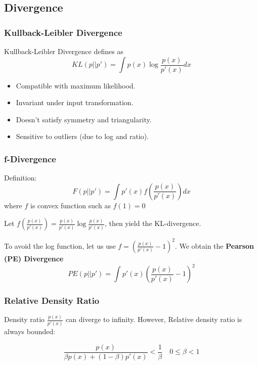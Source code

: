 \documentclass[slidestop,compress,mathserif]{beamer}
\begin{document}
	\subsection{Divergence}
	\begin{frame}
		\frametitle{Kullback-Leibler Divergence}
		Kullback-Leibler Divergence defines as
		\begin{equation}
			KL(p||p') = \int p(x) \log\frac{p(x)}{p'(x)}dx
		\end{equation}
		\begin{itemize}
			\item[\smiley]  Compatible with maximum likelihood.
			\item[\smiley]  Invariant under input transformation.
			\item[\frownie]  Doesn’t satisfy symmetry and triangularity.
			\item[\frownie]  Sensitive to outliers (due to log and ratio).
		\end{itemize}
	\end{frame}
	
	\begin{frame}
		\frametitle{f-Divergence}
		Definition:
		\begin{equation}
			F(p||p') = \int p'(x)f\left(\frac{p(x)}{p'(x)}\right)dx
		\end{equation}
		where $f$ is convex function such as $f(1)=0$
		
		Let $f\left(\frac{p(x)}{p'(x)}\right) = \frac{p(x)}{p'(x)}\log \frac{p(x)}{p'(x)}$, then yield the KL-divergence.
		
		To avoid the log function, let us use $f = \left(\frac{p(x)}{p'(x)}-1\right)^2$. We obtain the \textbf{Pearson (PE) Divergence}
		\begin{equation}
			PE(p||p') = \int p'(x)\left(\frac{p(x)}{p'(x)}-1\right)^2
		\end{equation}
	\end{frame}
	
	\begin{frame}
		\frametitle{Relative Density Ratio}
		Density ratio $\frac{p(x)}{p'(x)}$ can diverge to infinity. However, Relative density ratio is always bounded:
		
		\begin{equation}
			\frac{p(x)}{\beta p(x) + (1-\beta)p'(x)} < \frac{1}{\beta} \quad 0\le\beta<1
		\end{equation}
		\begin{figure}
		\end{figure}
	\end{frame}
	
\end{document}
